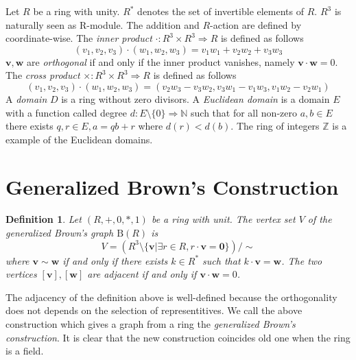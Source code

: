 \documentclass{article}
\newtheorem{Def}{Definition}
\newcommand{\Z}{\mathbb Z}
\newcommand{\N}{\mathbb N}
\newcommand{\B}{\mathrm{B}}
\begin{document}
\iffalse

The {\it tensor product} of two graphs $G_1=(V_1,E_1),G_2=(V_2,E_2)$ is a graph $G_1 \otimes G_2$ such that the vertex set is a cartesian product of $V_1$ and $V_2$ and two vertices $(v_1,v_2) \sim (w_1,w_2)$ if and only if $v_1 \sim v_2$ and $w_1 \sim w_2$. If $G_1, G_2$ are regular, the tensor product $G_1 \times G_2$ is also regular. 

\fi

Let $R$ be a ring with unity. 
$R^*$ denotes the set of invertible elements of $R$.
$R^3$ is naturally seen as R-module. 
The addition and $R$-action are defined by coordinate-wise.
The {\it inner product} $\cdot: R^3 \times R^3 \Rightarrow R$ is defined as follows
\[ (v_1,v_2,v_3) \cdot (w_1,w_2,w_3) = v_1 w_1 + v_2 w_2 + v_3 w_3 \]
${\bm v}, {\bm w}$ are {\it orthogonal} if and only if the inner product vanishes, namely ${\bm v} \cdot {\bm w} = 0$.
The {\it cross product} $\times: R^3 \times R^3 \Rightarrow R$ is defined as follows
\[ (v_1,v_2,v_3) \cdot (w_1,w_2,w_3) = ( v_2 w_3 - v_3 w_2, v_3 w_1 - v_1 w_3, v_1 w_2 - v_2 w_1 ) \]
A {\it domain} $D$ is a ring without zero divisors.
A {\it Euclidean domain} is a domain $E$ with a function called degree $d: E \setminus \{0\} \Rightarrow \N$ such that for all non-zero $a,b \in E$ there exists $q,r \in E, a = q b + r$ where $d(r) < d(b)$.
The ring of integers $\Z$ is a example of the Euclidean domains.


\section{Generalized Brown's Construction}
\begin{Def}
Let $(R,+,0,*,1)$ be a ring with unit. The vertex set $V$ of the generalized Brown's graph $\B(R)$ is \[ V = ( R^3 \setminus \{\bm v | \exists r \in R, r \cdot {\bm v} = {\bm 0} \} ) / \sim\]
where $\bm v \sim \bm w$ if and only if there exists $k \in R^*$ such that $k \cdot {\bm v} = {\bm w}$. The two vertices $[\bm v],[\bm w]$ are adjacent if and only if ${\bm v} \cdot {\bm w} = 0$.
\end{Def}

The adjacency of the definition above is well-defined because the orthogonality does not depends on the selection of representitives. We call the above construction which gives a graph from a ring the {\it generalized Brown's construction}. It is clear that the new construction coincides old one when the ring is a field.
\end{document}
